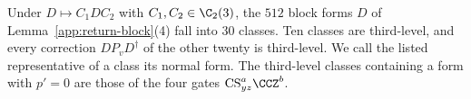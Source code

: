 Under $D\mapsto C_1DC_2$ with $C_1,C_2\in\C_2(3)$, the $512$ block forms $D$ of Lemma~\ref{app:return-block}\textup{(4)} fall into $30$ classes. Ten classes are third-level, and every correction $DP_vD^\dagger$ of the other twenty is third-level. We call the listed representative of a class its normal form. The third-level classes containing a form with $p'=0$ are those of the four gates $\mathrm{CS}_{yz}^a\CCZ^b$.
